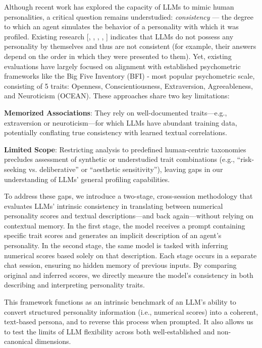 \documentclass[12pt]{article}
\begin{document}
Although recent work has explored the capacity of LLMs to mimic human personalities, a critical question remains understudied: \textit{consistency} — the degree to which an agent simulates the behavior of a personality with which it was profiled. Existing research [\cite{frisch2024llm}, \cite{tommaso2024llms}, \cite{shu2023you}, \cite{song2023have} \cite{jiang2023personallm}, \cite{gupta2023self}] indicates that LLMs do not possess any personality by themselves and thus are not consistent (for example, their answers depend on the order in which they were presented to them). Yet, existing evaluations have largely focused on alignment with established psychometric frameworks like the Big Five Inventory (BFI) - most popular psychometric scale, consisting of 5 traits: Openness, Conscientiousness, Extraversion, Agreeableness, and Neuroticism (OCEAN). These approaches share two key limitations:

    \textbf{Memorized Associations}: They rely on well-documented traits—e.g., extraversion or neuroticism—for which LLMs have abundant training data, potentially conflating true consistency with learned textual correlations.

    \textbf{Limited Scope}: Restricting analysis to predefined human-centric taxonomies precludes assessment of synthetic or understudied trait combinations (e.g., “risk-seeking vs. deliberative” or “aesthetic sensitivity”), leaving gaps in our understanding of LLMs’ general profiling capabilities.

To address these gaps, we introduce a two-stage, cross-session methodology that evaluates LLMs' intrinsic consistency in translating between numerical personality scores and textual descriptions—and back again—without relying on contextual memory. In the first stage, the model receives a prompt containing specific trait scores and generates an implicit description of an agent’s personality. In the second stage, the same model is tasked with inferring numerical scores based solely on that description. Each stage occurs in a separate chat session, ensuring no hidden memory of previous inputs. By comparing original and inferred scores, we directly measure the model’s consistency in both describing and interpreting personality traits.

This framework functions as an intrinsic benchmark of an LLM's ability to convert structured personality information (i.e., numerical scores) into a coherent, text-based persona, and to reverse this process when prompted. It also allows us to test the limits of LLM flexibility across both well-established and non-canonical dimensions.
\end{document}
